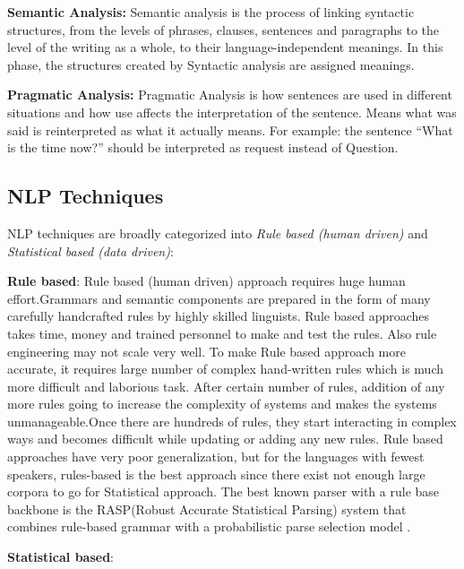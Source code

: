\documentclass[sigconf]{acmart}
\begin{document}
\par\null\par
\textbf{Semantic Analysis:}
     Semantic analysis is the process of linking syntactic structures, from the levels of phrases, clauses, sentences and paragraphs to the level of the writing as a whole, to their language-independent meanings. In this phase, the structures created by Syntactic analysis are assigned meanings.
\par\null\par
\textbf{Pragmatic Analysis:}
     Pragmatic Analysis is how sentences are used in different situations and how use affects the interpretation of the sentence. Means what was said is reinterpreted as what it actually means. For example: the sentence ``What is the time now?'' should be interpreted as request instead of Question.
\subsection{NLP Techniques}
NLP techniques are broadly categorized into \textit{Rule based (human driven)} and \textit{Statistical based (data driven)}:
\par\null\par
\textbf{Rule based}:
   Rule based (human driven) approach requires huge human effort.Grammars and semantic components are prepared in the form of many carefully handcrafted rules by highly skilled linguists. Rule based approaches takes time, money and trained personnel to make and test the rules. Also rule engineering may not scale very well. To make Rule based approach more accurate, it requires large number of complex hand-written rules which is  much more difficult and laborious task. After certain number of rules, addition of any more rules going to increase the complexity of systems and makes the systems unmanageable.Once there are hundreds of rules, they start interacting in complex ways and becomes difficult while updating or adding any new rules. Rule based approaches have very poor generalization, but for the languages with fewest speakers, rules-based is the best approach since there exist not enough large corpora to go for Statistical approach. The  best  known  parser  with  a  rule base  backbone is the RASP(Robust Accurate Statistical Parsing) system that combines rule-based grammar with a probabilistic parse selection model \cite{Kovář2014}.
\par\null\par
\textbf{Statistical based}:
\end{document}
